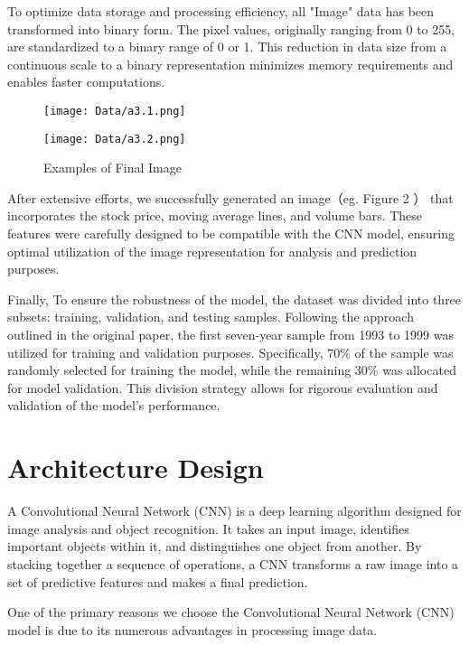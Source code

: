 \documentclass{article}
\begin{document}
To optimize data storage and processing efficiency, all "Image" data has been transformed into binary form. The pixel values, originally ranging from 0 to 255, are standardized to a binary range of 0 or 1. This reduction in data size from a continuous scale to a binary representation minimizes memory requirements and enables faster computations. 

\begin{figure}[ht]
	\centering
	\begin{minipage}[b]{0.49\linewidth}
		\centering
		\texttt{[image: Data/a3.1.png]} 
	\end{minipage}
	\hfill
	\begin{minipage}[b]{0.49\linewidth}
		\centering
		\texttt{[image: Data/a3.2.png]} 
	\end{minipage}
	\caption{Examples of Final Image}
\end{figure}

After extensive efforts, we successfully generated an image（eg. Figure 2 ） that incorporates the stock price, moving average lines, and volume bars. These features were carefully designed to be compatible with the CNN model, ensuring optimal utilization of the image representation for analysis and prediction purposes.

Finally, To ensure the robustness of the model, the dataset was divided into three subsets: training, validation, and testing samples. Following the approach outlined in the original paper, the first seven-year sample from 1993 to 1999 was utilized for training and validation purposes. Specifically, 70\% of the sample was randomly selected for training the model, while the remaining 30\% was allocated for model validation. This division strategy allows for rigorous evaluation and validation of the model's performance.

\section{Architecture Design}
A Convolutional Neural Network (CNN) is a deep learning algorithm designed for image analysis and object recognition. It takes an input image, identifies important objects within it, and distinguishes one object from another. By stacking together a sequence of operations, a CNN transforms a raw image into a set of predictive features and makes a final prediction. 

One of the primary reasons we choose the Convolutional Neural Network (CNN) model is due to its numerous advantages in processing image data.
\end{document}
